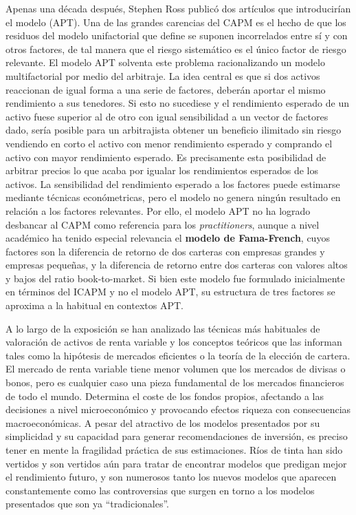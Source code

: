 \documentclass{nuevotema}
\begin{document}
Apenas una década después, Stephen Ross publicó dos artículos que introducirían el modelo  (APT). Una de las grandes carencias del CAPM es el hecho de que los residuos del modelo unifactorial que define se suponen incorrelados entre sí y con otros factores, de tal manera que el riesgo sistemático es el único factor de riesgo relevante. El modelo APT solventa este problema racionalizando un modelo multifactorial por medio del arbitraje. La idea central es que si dos activos reaccionan de igual forma a una serie de factores, deberán aportar el mismo rendimiento a sus tenedores. Si esto no sucediese y el rendimiento esperado de un activo fuese superior al de otro con igual sensibilidad a un vector de factores dado, sería posible para un arbitrajista obtener un beneficio ilimitado sin riesgo vendiendo en corto el activo con menor rendimiento esperado y comprando el activo con mayor rendimiento esperado. Es precisamente esta posibilidad de arbitrar precios lo que acaba por igualar los rendimientos esperados de los activos. La sensibilidad del rendimiento esperado a los factores puede estimarse mediante técnicas económetricas, pero el modelo no genera ningún resultado en relación a los factores relevantes. Por ello, el modelo APT no ha logrado desbancar al CAPM como referencia para los \textit{practitioners}, aunque a nivel académico ha tenido especial relevancia el \textbf{modelo de Fama-French}, cuyos factores son la diferencia de retorno de dos carteras con empresas grandes y empresas pequeñas, y la diferencia de retorno entre dos carteras con valores altos y bajos del ratio book-to-market. Si bien este modelo fue formulado inicialmente en términos del ICAPM y no el modelo APT, su estructura de tres factores se aproxima a la habitual en contextos APT.

A lo largo de la exposición se han analizado las técnicas más habituales de valoración de activos de renta variable y los conceptos teóricos que las informan tales como la hipótesis de mercados eficientes o la teoría de la elección de cartera. El mercado de renta variable tiene menor volumen que los mercados de divisas o bonos, pero es cualquier caso una pieza fundamental de los mercados financieros de todo el mundo. Determina el coste de los fondos propios, afectando a las decisiones a nivel microeconómico y provocando efectos riqueza con consecuencias macroeconómicas. A pesar del atractivo de los modelos presentados por su simplicidad y su capacidad para generar recomendaciones de inversión, es preciso tener en mente la fragilidad práctica de sus estimaciones. Ríos de tinta han sido vertidos y son vertidos aún para tratar de encontrar modelos que predigan mejor el rendimiento futuro, y son numerosos tanto los nuevos modelos que aparecen constantemente como las controversias que surgen en torno a los modelos presentados que son ya ``tradicionales''.
\end{document}
